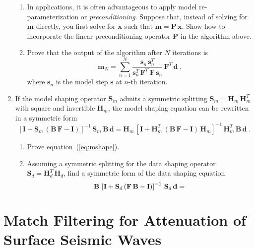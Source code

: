 \begin{enumerate}
\begin{enumerate}
\item  In applications, it is often advantageous to apply model
    re-parameterization or \emph{preconditioning}. Suppose that,
  instead of solving for $\mathbf{m}$ directly, you first solve for
  $\mathbf{x}$ such that $\mathbf{m} = \mathbf{P}\,\mathbf{x}$. Show
  how to incorporate the linear preconditioning operator $\mathbf{P}$
  in the algorithm above.
\item Prove that the output of the algorithm after $N$ iterations is
\begin{equation}
\label{eq:msol}
\mathbf{m}_N = \sum\limits_{n=1}^{N} \frac{\mathbf{s}_n\,\mathbf{s}_n^T}{\mathbf{s}_n^T\,\mathbf{F}^T\,\mathbf{F}\,\mathbf{s}_n}\,\mathbf{F}^T\,\mathbf{d}\;,
\end{equation}
where $\mathbf{s}_n$ is the model step $\mathbf{s}$ at $n$-th iteration.

\end{enumerate}

\item If the model shaping operator $\mathbf{S}_m$ admits a
symmetric splitting $\mathbf{S}_m=\mathbf{H}_m\,\mathbf{H}_m^T$ with square and invertible
$\mathbf{H}_m$, the model shaping equation can be rewritten in a symmetric form
\begin{equation}
\label{eq:mshape}
\left[\mathbf{I} + \mathbf{S}_m\,(\mathbf{B\,F - I})\right]^{-1}\,\mathbf{S}_m\,\mathbf{B\,d} 
= \mathbf{H}_m\,\left[\mathbf{I} + \mathbf{H}_m^T\,(\mathbf{B\,F - I})\,\mathbf{H}_m\right]^{-1}\,\mathbf{H}_m^T\,\mathbf{B\,d}\;.
\end{equation}
\begin{enumerate}
\item Prove equation~(\ref{eq:mshape}).
\item Assuming a symmetric splitting for the data shaping operator $\mathbf{S}_d=\mathbf{H}_d^T\,\mathbf{H}_d$, find a symmetric form of the data shaping equation
\begin{equation}
\label{eq:dshape}
\mathbf{B}\,\left[\mathbf{I} + \mathbf{S}_d\,(\mathbf{F\,B - I})\right]^{-1}\, \mathbf{S}_d\,\mathbf{d} = \hfill \ 
\end{equation}
\end{enumerate}

\end{enumerate}

\newpage

\section{Match Filtering for Attenuation of Surface Seismic Waves}
\inputdir{match}

